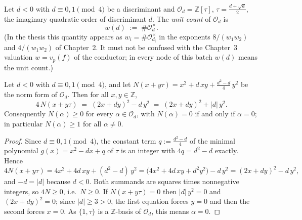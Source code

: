 %

\begin{definition}\label{infra-units-w}
  Let $d < 0$ with $d \equiv 0, 1 \pmod 4$ be a discriminant and
  $\mathcal{O}_d = \mathbb{Z}[\tau]$, $\tau = \tfrac{d+\sqrt d}{2}$, the imaginary
  quadratic order of discriminant $d$. The \emph{unit count} of $\mathcal{O}_d$ is
  \[
    w(d) \;:=\; \#\mathcal{O}_d^\times .
  \]
  (In the thesis this quantity appears as $w_i = \#\mathcal{O}_{d_i}^\times$ in the
  exponents $8/(w_1w_2)$ and $4/(w_1w_2)$ of Chapter~2. It must not be confused with
  the Chapter~3 valuation $w = v_p(f)$ of the conductor; in every node of this batch
  $w(d)$ means the unit count.)
\end{definition}

\begin{lemma}\label{infra-units-norm-pos}
  Let $d < 0$ with $d \equiv 0, 1 \pmod 4$, and let
  $N(x + y\tau) = x^2 + d\,xy + \tfrac{d^2-d}{4}\,y^2$ be the norm form of
  $\mathcal{O}_d$. Then for all $x, y \in \mathbb{Z}$,
  \[
    4\,N(x + y\tau) \;=\; (2x + dy)^2 - d\,y^2 \;=\; (2x + dy)^2 + |d|\,y^2 .
  \]
  Consequently $N(\alpha) \ge 0$ for every $\alpha \in \mathcal{O}_d$, with
  $N(\alpha) = 0$ if and only if $\alpha = 0$; in particular $N(\alpha) \ge 1$
  for all $\alpha \ne 0$.
\end{lemma}

\begin{proof}
  Since $d \equiv 0, 1 \pmod 4$, the constant term $q := \tfrac{d^2-d}{4}$ of the
  minimal polynomial $g(x) = x^2 - dx + q$ of $\tau$ is an integer with
  $4q = d^2 - d$ exactly. Hence
  \[
    4N(x+y\tau)
      = 4x^2 + 4d\,xy + (d^2-d)\,y^2
      = \bigl(4x^2 + 4d\,xy + d^2y^2\bigr) - d\,y^2
      = (2x+dy)^2 - d\,y^2 ,
  \]
  and $-d = |d|$ because $d < 0$. Both summands are squares times nonnegative
  integers, so $4N \ge 0$, i.e.\ $N \ge 0$. If $N(x+y\tau) = 0$ then
  $|d|\,y^2 = 0$ and $(2x+dy)^2 = 0$; since $|d| \ge 3 > 0$, the first equation
  forces $y = 0$ and then the second forces $x = 0$. As $\{1, \tau\}$ is a
  $\mathbb{Z}$-basis of $\mathcal{O}_d$, this means $\alpha = 0$.
\end{proof}

